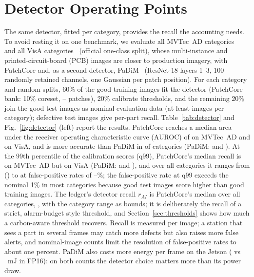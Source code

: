 \section{Detector Operating Points}
\label{sec:detector}
The same detector, fitted per category, provides the recall the accounting needs. To avoid resting it on one benchmark, we evaluate all \DetMvtecCategories{} MVTec~AD categories~\cite{bergmann2021mvtec} and all \DetVisaCategories{} VisA categories~\cite{zou2022visa} (official one-class split), whose multi-instance and printed-circuit-board (PCB) images are closer to production imagery, with PatchCore and, as a second detector, PaDiM~\cite{defard2021padim} (ResNet-18 layers 1--3, 100 randomly retained channels, one Gaussian per patch position). For each category and \DetSeeds{} random splits, 60\% of the good training images fit the detector (PatchCore bank: 10\% coreset, \DetBankMin--\DetBankMax{} patches), 20\% calibrate thresholds, and the remaining 20\% join the good test images as nominal evaluation data (at least \DetGoodEvalMin{} images per category); defective test images give per-part recall. Table~\ref{tab:detector} and Fig.~\ref{fig:detector} (left) report the results. PatchCore reaches a median area under the receiver operating characteristic curve (AUROC) of \DetPcMvtecAurocMedian{} on MVTec~AD and \DetPcVisaAurocMedian{} on VisA, and is more accurate than PaDiM in \DetPcBeatsPdAuroc{} of \DetCategories{} categories (PaDiM: \DetPdMvtecAurocMedian{} and \DetPdVisaAurocMedian). At the 99th percentile of the calibration scores (q99), PatchCore's median recall is \DetPcMvtecRecallMedian{} on MVTec~AD but \DetPcVisaRecallMedian{} on VisA (PaDiM: \DetPdMvtecRecallMedian{} and \DetPdVisaRecallMedian), and over all categories it ranges from \DetRecallMin{} (\DetWorstCategory) to \DetRecallMax{} at false-positive rates of \DetFprMin--\DetFprMax\%; the false-positive rate at q99 exceeds the nominal 1\% in most categories because good test images score higher than good training images. The ledger's detector recall $r_{AI}$ is PatchCore's median over all \DetCategories{} categories, \DetRecallMedian, with the category range as bounds; it is deliberately the recall of a strict, alarm-budget style threshold, and Section~\ref{sec:thresholds} shows how much a carbon-aware threshold recovers. Recall is measured per image; a station that sees a part in several frames may catch more defects but also raises more false alerts, and nominal-image counts limit the resolution of false-positive rates to about one percent. PaDiM also costs more energy per frame on the Jetson (\JetsonPdHalfFrameMJ{} vs \JetsonPcHalfFrameMJ~mJ in FP16): on both counts the detector choice matters more than its power draw.

